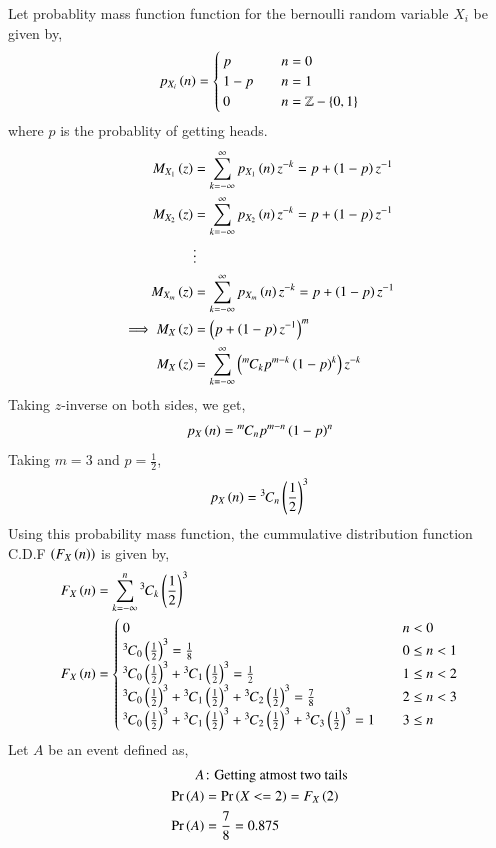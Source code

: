 \documentclass[journal]{IEEEtran}
\begin{document}
Let probablity mass function function for the bernoulli random variable $X_{i}$ be given by,
\begin{align}
    p_{X_{i}}\left(n\right) = \begin{cases}
        p & \quad n = 0\\
        1 - p & \quad n = 1\\
        0 & \quad n = \mathbb{Z} - \left\{0, 1\right\}
    \end{cases}
\end{align}
where $p$ is the probablity of getting heads.
\begin{align}
    M_{X_1}\left(z\right) &= \sum_{k = -\infty}^{\infty} p_{X_{1}}\left(n\right) z^{-k} = p + \left(1 - p\right) z^{-1}\\
    M_{X_2}\left(z\right) &= \sum_{k = -\infty}^{\infty} p_{X_{2}}\left(n\right) z^{-k} = p + \left(1 - p\right) z^{-1}\\
                    &\vdots\\
    M_{X_m}\left(z\right) &= \sum_{k = -\infty}^{\infty} p_{X_{m}}\left(n\right) z^{-k} = p + \left(1 - p\right) z^{-1}\\
    \implies M_{X}\left(z\right) &= \left(p + \left(1 - p\right) z^{-1}\right)^{m}\\
    M_{X}\left(z\right) &= \sum_{k = -\infty}^{\infty} \left({{}^{m}\mkern-1muC_{k}} p^{m - k} \left(1 - p\right)^{k}\right) z^{-k}\\
\end{align}
Taking $z$-inverse on both sides, we get,
\begin{align}
    p_{X}\left(n\right) = {{}^{m}\mkern-1muC_{n}} p^{m - n} \left(1 - p\right)^{n}
\end{align}
Taking $m = 3$ and $p = \frac{1}{2}$,
\begin{align}
    p_{X}\left(n\right) = {{}^{3}\mkern-1muC_{n}} \left(\frac{1}{2}\right)^{3}
\end{align}
Using this probability mass function, the cummulative distribution function C.D.F $\left(F_{X}\left(n\right)\right)$ is given by,
\begin{align}
    F_{X}\left(n\right) &= \sum_{k = -\infty}^{n}  {{}^{3}\mkern-1muC_{k}} \left(\frac{1}{2}\right)^{3}\\
    F_{X}\left(n\right) &= \begin{cases}
        0 & \quad n < 0\\
        {{}^{3}\mkern-1muC_{0}}\left(\frac{1}{2}\right)^3 = \frac{1}{8} & \quad 0 \leq n < 1\\
        {{}^{3}\mkern-1muC_{0}}\left(\frac{1}{2}\right)^3 + {{}^{3}\mkern-1muC_{1}}\left(\frac{1}{2}\right)^3 = \frac{1}{2} & \quad 1 \leq n < 2\\
        {{}^{3}\mkern-1muC_{0}}\left(\frac{1}{2}\right)^3 + {{}^{3}\mkern-1muC_{1}}\left(\frac{1}{2}\right)^3 + {{}^{3}\mkern-1muC_{2}}\left(\frac{1}{2}\right)^3 = \frac{7}{8} & \quad 2 \leq n < 3\\
        {{}^{3}\mkern-1muC_{0}}\left(\frac{1}{2}\right)^3 + {{}^{3}\mkern-1muC_{1}}\left(\frac{1}{2}\right)^3 + {{}^{3}\mkern-1muC_{2}}\left(\frac{1}{2}\right)^3 + {{}^{3}\mkern-1muC_{3}}\left(\frac{1}{2}\right)^3 = 1 & \quad 3 \leq n
    \end{cases}
\end{align}
Let $A$ be an event defined as,
\begin{align}
    A&\colon\text{Getting atmost two tails}\\
    \Pr\left(A\right) &= \Pr\left(X<=2\right) = F_{X}\left(2\right)\\
    \Pr\left(A\right) &= \frac{7}{8} = 0.875
\end{align}
\end{document}
